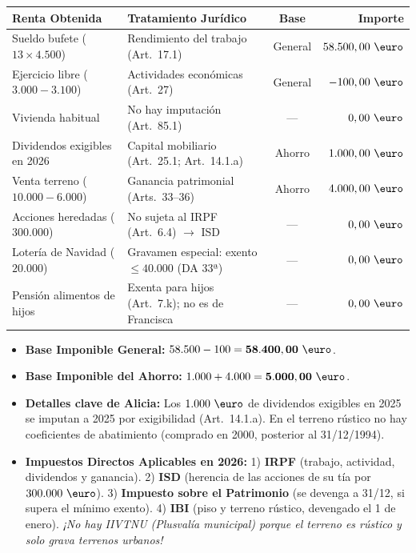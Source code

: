 \documentclass[11pt,a4paper,openany]{article}
\begin{document}
\begin{solucionBox}
\begin{center}
\small
\begin{tabularx}{\textwidth}{l p{5.5cm} c r}
\toprule
\textbf{Renta Obtenida} & \textbf{Tratamiento Jurídico} & \textbf{Base} & \textbf{Importe} \\
\midrule
Sueldo bufete ($13 \times 4.500$) & Rendimiento del trabajo (Art.~17.1) & General & $58.500,00\text{ \euro}$ \\
Ejercicio libre ($3.000 - 3.100$) & Actividades económicas (Art.~27) & General & $-100,00\text{ \euro}$ \\
Vivienda habitual & No hay imputación (Art.~85.1) & --- & $0,00\text{ \euro}$ \\
Dividendos exigibles en 2026 & Capital mobiliario (Art.~25.1; Art.~14.1.a) & Ahorro & $1.000,00\text{ \euro}$ \\
Venta terreno ($10.000 - 6.000$) & Ganancia patrimonial (Arts.~33--36) & Ahorro & $4.000,00\text{ \euro}$ \\
Acciones heredadas ($300.000$) & No sujeta al IRPF (Art.~6.4) $\to$ ISD & --- & $0,00\text{ \euro}$ \\
Lotería de Navidad ($20.000$) & Gravamen especial: exento $\le 40.000$ (DA 33ª) & --- & $0,00\text{ \euro}$ \\
Pensión alimentos de hijos & Exenta para hijos (Art.~7.k); no es de Francisca & --- & $0,00\text{ \euro}$ \\
\bottomrule
\end{tabularx}
\end{center}
\begin{itemize}[itemsep=2pt]
    \item \textbf{Base Imponible General:} $58.500 - 100 = \mathbf{58.400,00\text{ \euro}}$.
    \item \textbf{Base Imponible del Ahorro:} $1.000 + 4.000 = \mathbf{5.000,00\text{ \euro}}$.
    \item \textbf{Detalles clave de Alicia:} Los $1.000\text{ \euro}$ de dividendos exigibles en 2025 se imputan a 2025 por exigibilidad (Art.~14.1.a). En el terreno rústico no hay coeficientes de abatimiento (comprado en 2000, posterior al 31/12/1994).
    \item \textbf{Impuestos Directos Aplicables en 2026:}
    1) \textbf{IRPF} (trabajo, actividad, dividendos y ganancia).
    2) \textbf{ISD} (herencia de las acciones de su tía por $300.000\text{ \euro}$).
    3) \textbf{Impuesto sobre el Patrimonio} (se devenga a 31/12, si supera el mínimo exento).
    4) \textbf{IBI} (piso y terreno rústico, devengado el 1 de enero).
    \textit{¡No hay IIVTNU (Plusvalía municipal) porque el terreno es rústico y solo grava terrenos urbanos!}
\end{itemize}
\end{solucionBox}
\end{document}

